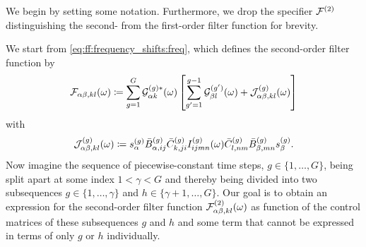 We begin by setting some notation.
Furthermore, we drop the specifier $\mathcal{F}^{(2)}$ distinguishing the second- from the first-order filter function for brevity.

We start from \cref{eq:ff:frequency_shifts:freq}, which defines the second-order filter function by
\begin{equation}
    \mathcal{F}_{\alpha\beta,kl}(\omega) \coloneqq \sum_{g=1}^{G}\mathcal{G}_{\alpha k}^{(g)\ast}(\omega)\left[
        \sum_{g^{\prime}=1}^{g-1}\mathcal{G}_{\beta l}^{(g^{\prime})}(\omega) + \mathcal{J}_{\alpha\beta,kl}^{(g)}(\omega)
    \right]
\end{equation}
with
\begin{equation}
    \mathcal{J}_{\alpha\beta,kl}^{(g)}(\omega) \coloneqq s_\alpha^{(g)}\bar{B}_{\alpha,ij}^{(g)}\bar{C}_{k,ji}^{(g)} I_{ijmn}^{(g)}(\omega)\bar{C}_{l,nm}^{(g)}\bar{B}_{\beta,mn}^{(g)} s_\beta^{(g)}.
\end{equation}
Now imagine the sequence of piecewise-constant time steps, $g\in\{1,\dotsc,G\}$, being split apart at some index $1<\gamma<G$ and thereby being divided into two subsequences $g\in\{1,\dotsc,\gamma\}$ and $h\in\{\gamma + 1,\dotsc, G\}$.
Our goal is to obtain an expression for the second-order filter function $\mathcal{F}_{\alpha\beta,kl}^{(2)}(\omega)$ as function of the control matrices of these subsequences $g$ and $h$ and some term that cannot be expressed in terms of only $g$ or $h$ individually.

